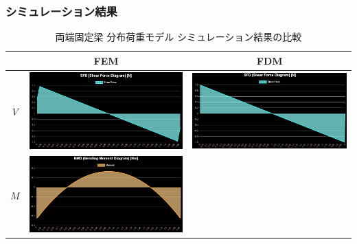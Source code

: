 \documentclass{jsarticle}
\begin{document}
\subsubsection{シミュレーション結果}
\begin{table}[H]
\begin{center}
\caption{両端固定梁 分布荷重モデル シミュレーション結果の比較}
\begin{tabular}{|c|c|c|}
\hline
 & FEM & FDM \\
\hline
\hline
$V$ &
\begin{minipage}{6truecm}
\centering
\includegraphics[width=6truecm]{fixed_distributed_model_FEM_sf.PNG}
\end{minipage}
&
\begin{minipage}{6truecm}
\centering
\includegraphics[width=6truecm]{fixed_distributed_model_FDM_sf.PNG}
\end{minipage}
\\
\hline
$M$ &
\begin{minipage}{6truecm}
\centering
\includegraphics[width=6cm]{fixed_distributed_model_FEM_bm.PNG}

\end{minipage}
\end{tabular}
\end{center}
\end{table}
\end{document}
